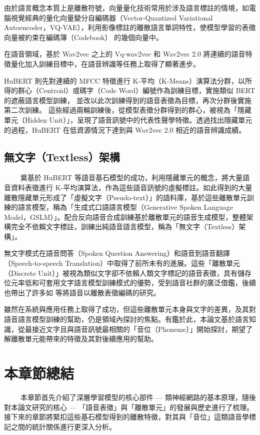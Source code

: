 由於語言概念本質上是離散符號，向量量化技術常用於涉及語言標註的情境，如電腦視覺經典的量化向量變分自編碼器（Vector-Quantized Variational Autoencoder，VQ-VAE）\cite{van2017neural}，利用影像標註的離散語言單詞特性，使模型學習的表徵向量被約束在編碼簿（Codebook） 的幾個向量中。

在語音領域，基於 Wav2vec 之上的 Vq-wav2vec \cite{baevski2019vq} 和 Wav2vec 2.0 將連續的語音特徵量化加入訓練目標中，在語音辨識等任務上取得了顯著進步。

HuBERT \cite{hsu_hubert_2021-2} 則先對連續的 MFCC 特徵進行 K-平均（K-Means）演算法分群，以所得的群心（Centroid）或碼字（Code Word）編號作為訓練目標，實施類似 BERT 的遮蔽語言模型訓練，
並改以此次訓練得到的語音表徵為目標，再次分群後實施第二次訓練。
這些經過兩輪訓練後，從模型表徵分群得到的群心，被視為「隱藏單元（Hidden Unit）」，呈現了語音訊號中的代表性聲學特徵。透過找出隱藏單元的過程，HuBERT 在低資源情況下達到與 Wav2vec 2.0 相近的語音辨識成績。

\subsection{無文字（Textless）架構}
　　
奠基於 HuBERT 等語音基石模型的成功，利用隱藏單元的概念，將大量語音資料表徵進行 K-平均演算法，作為這些語音訊號的虛擬標註。如此得到的大量離散隱藏單元形成了「虛擬文字（Pseudo-text）」的語料庫，基於這些離散單元訓練的語言模型，稱為「生成式口語語言模型（Generative Spoken Language Model，GSLM）」\cite{lakhotia_generative_2021-1}。配合反向語音合成訓練基於離散單元的語音生成模型，整體架構完全不依賴文字標註，訓練出純語音語言模型，稱為「無文字（Textless）架構」\cite{noauthor_textless_2021}。

無文字模式在語音問答（Spoken Question Answering）\cite{lin2022dual}和語音到語音翻譯 （Speech-to-speech Translation）\cite{chen_speech--speech_2023}中取得了前所未有的進展。這些「離散單元（Discrete Unit）」被視為類似文字卻不依賴人類文字標記的語音表徵，具有儲存位元率低和可套用文字語言模型訓練模式的優勢，受到語音社群的廣泛借鑑，後續也帶出了許多如\cite{zhang2024speechtokenizer} 等將語音以離散表徵編碼的研究。

雖然在系統與應用任務上取得了成功，但這些離散單元本身與文字的差異，及其對語音語言模型訓練的幫助，仍是領域內探討的焦點。有鑑於此，本論文基於語言知識，從最接近文字且與語音訊號最相關的「音位（Phoneme）」開始探討，期望了解離散單元能帶來的特徵及其對後續應用的幫助。

\section{本章節總結}
　　
本章節首先介紹了深層學習模型的核心部件 --- 類神經網路的基本原理，隨後對本論文研究的核心 --- 「語音表徵」與「離散單元」的發展與歷史進行了梳理。接下來的章節將緊扣這些基石模型得到的離散特徵，對其與「音位」這類語音學標記之間的統計關係進行更深入分析。
